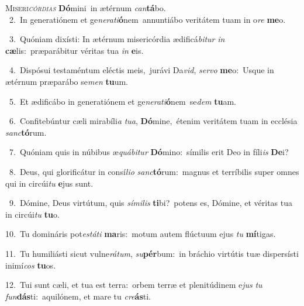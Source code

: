 \lettrine{\initial\textcolor{\initialcolor}{M}}{iseri\-\textit{cór}\-\textit{di}\textit{as}} \textbf{Dó}\-mini~\star in ætérnum \textit{can}\-\textbf{tá}bo.\\
{\numbfont\textcolor{\numbcolor}{~2.}}~In generatiónem et ge\-\textit{ne}\-\textit{ra}\textit{ti}\textbf{ó}nem~\star annuntiábo veritátem tuam in o\textit{re} \textbf{me}\-o.\par
{\numbfont\textcolor{\numbcolor}{~3.}}~Quóniam dixísti: In ætérnum misericórdia ædificá\-\textit{bi}\-\textit{tur} \textit{in} \textbf{cæ}\-lis:~\star præparábitur véritas tua \textit{in} \textbf{e}\-is.\par
{\numbfont\textcolor{\numbcolor}{~4.}}~Dispósui testaméntum eléctis meis,~\dagger jurávi Da\-\textit{vid}\-, \textit{ser}\-\textit{vo} \textbf{me}\-o:~\star Usque in ætérnum præparábo se\textit{men} \textbf{tu}\-um.\par
{\numbfont\textcolor{\numbcolor}{~5.}}~Et ædificábo in generatiónem et ge\-\textit{ne}\-\textit{ra}\textit{ti}\textbf{ó}nem~\star se\textit{dem} \textbf{tu}\-am.\par
{\numbfont\textcolor{\numbcolor}{~6.}}~Confitebúntur cæli mirabíli\textit{a} \textit{tu}\-\textit{a}, \textbf{Dó}\-mine,~\star étenim veritátem tuam in ecclésia \textit{sanc}\-\textbf{tó}rum.\par
{\numbfont\textcolor{\numbcolor}{~7.}}~Quóniam quis in núbibus æ\-\textit{quá}\-\textit{bi}\textit{tur} \textbf{Dó}\-mino:~\star símilis erit Deo in fíli\textit{is} \textbf{De}\-i?\par
{\numbfont\textcolor{\numbcolor}{~8.}}~Deus, qui glorificátur in consí\-\textit{li}\-\textit{o} \textit{sanc}\-\textbf{tó}rum:~\star magnus et terríbilis super omnes qui in circúi\textit{tu} \textbf{e}\-jus sunt.\par
{\numbfont\textcolor{\numbcolor}{~9.}}~Dómine, Deus virtútum, quis \textit{sí}\-\textit{mi}\textit{lis} \textbf{ti}\-bi?~\star potens es, Dómine, et véritas tua in circúi\textit{tu} \textbf{tu}\-o.\par
{\numbfont\textcolor{\numbcolor}{10.}}~Tu domináris pot\-\textit{es}\-\textit{tá}\textit{ti} \textbf{ma}\-ris:~\star motum autem flúctuum ejus \textit{tu} \textbf{mí}\-tigas.\par
{\numbfont\textcolor{\numbcolor}{11.}}~Tu humiliásti sicut vulne\-\textit{rá}\-\textit{tum}, \textit{su}\-\textbf{pér}bum:~\star in bráchio virtútis tuæ dispersísti inimí\textit{cos} \textbf{tu}\-os.\par
{\numbfont\textcolor{\numbcolor}{12.}}~Tui sunt cæli, et tua est terra:~\dagger orbem terræ et plenitúdinem e\textit{jus} \textit{tu} \textit{fun}\-\textbf{dás}ti:~\star aquilónem, et mare tu \textit{cre}\-\textbf{ás}ti.\par
